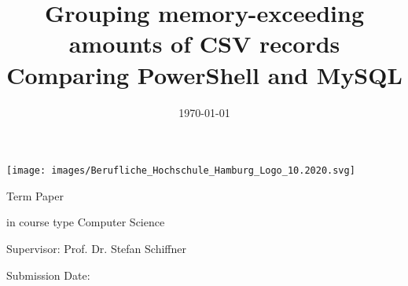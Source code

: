 \begin{center}
    \texttt{[image: images/Berufliche\_Hochschule\_Hamburg\_Logo\_10.2020.svg]}
\end{center}

\vspace*{10mm}
\begin{center}
\end{center}
\vspace*{10mm}

\title{Grouping memory-exceeding amounts of CSV records\\ \vspace{0,1cm} \large Comparing PowerShell and MySQL}
\date{\vspace{-3ex}}
{\let\newpage\relax\maketitle}
\thispagestyle{empty}

\begin{center}
\begin{large}
\begin{Large}
Term Paper\\
\end{Large}
in course type Computer Science \\
\end{large}
\end{center}
\vspace{1cm}
\begin{center}
\begin{large}
Supervisor: Prof. Dr. Stefan Schiffner\\
\end{large}
\end{center}
\begin{center}
\begin{large}
\end{large}
\end{center}

\begin{center}
\begin{large}
Submission Date: \date{\today} \\
\end{large}
\end{center}

\vspace{1,5cm}